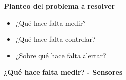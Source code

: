 \documentclass{beamer}
\begin{document}
\begin{frame}{\textbf{Planteo del problema a resolver}}
\fontsize{18pt}{15}\selectfont
	\begin{itemize}
		\item {¿Qué hace falta medir?}
		\vspace{20px}
		\item ¿Qué hace falta controlar?
		\vspace{20px}
		\item ¿Sobre qué hace falta alertar?
		\vspace{10px}
	\end{itemize}
\end{frame}

\begin{frame}{\textbf{¿Qué hace falta medir? - Sensores}}
\fontsize{14pt}{15}\selectfont


\end{frame}
\end{document}
